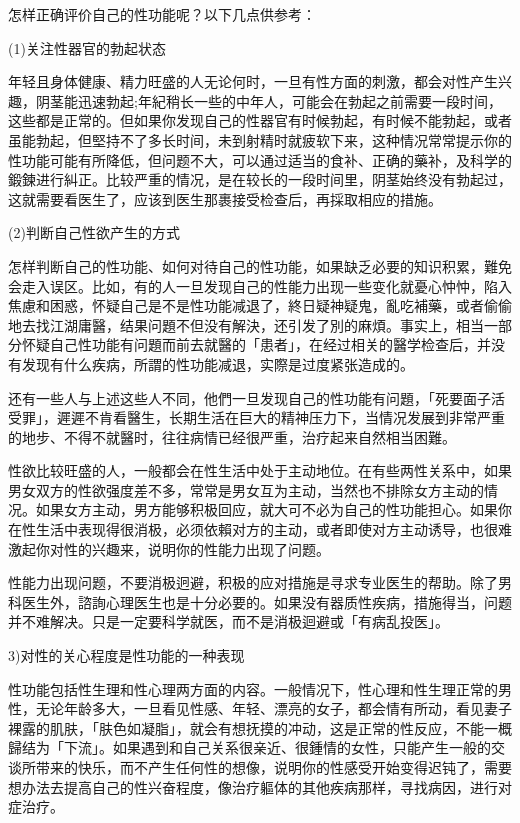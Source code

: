 \documentclass[12pt,UTF8]{ctexbook}
\begin{document}
怎样正确评价自己的性功能呢？以下几点供参考：

(1)关注性器官的勃起状态

年轻且身体健康、精力旺盛的人无论何时，一旦有性方面的刺激，都会对性产生兴趣，阴茎能迅速勃起;年紀稍长一些的中年人，可能会在勃起之前需要一段时间，这些都是正常的。但如果你发现自己的性器官有时候勃起，有时候不能勃起，或者虽能勃起，但堅持不了多长时间，未到射精时就疲软下来，这种情况常常提示你的性功能可能有所降低，但问题不大，可以通过适当的食补、正确的藥补，及科学的鍛鍊进行糾正。比较严重的情况，是在较长的一段时间里，阴茎始终没有勃起过，这就需要看医生了，应该到医生那裹接受检查后，再採取相应的措施。

(2)判断自己性欲产生的方式

怎样判断自己的性功能、如何对待自己的性功能，如果缺乏必要的知识积累，難免会走入误区。比如，有的人一旦发现自己的性能力出现一些变化就憂心忡忡，陷入焦慮和困惑，怀疑自己是不是性功能减退了，終日疑神疑鬼，亂吃補藥，或者偷偷地去找江湖庸醫，结果问題不但没有解決，还引发了別的麻煩。事实上，相当一部分怀疑自己性功能有问題而前去就醫的「患者」，在经过相关的醫学检查后，并没有发现有什么疾病，所謂的性功能减退，实際是过度紧张造成的。

还有一些人与上述这些人不同，他們一旦发现自己的性功能有问題，「死要面子活受罪」，遲遲不肯看醫生，长期生活在巨大的精神压力下，当情况发展到非常严重的地步、不得不就醫时，往往病情已经很严重，治疗起来自然相当困難。

性欲比较旺盛的人，一般都会在性生活中处于主动地位。在有些两性关系中，如果男女双方的性欲强度差不多，常常是男女互为主动，当然也不排除女方主动的情况。如果女方主动，男方能够积极回应，就大可不必为自己的性功能担心。如果你在性生活中表现得很消极，必须依賴对方的主动，或者即使对方主动诱导，也很难激起你对性的兴趣来，说明你的性能力出现了问题。

性能力出现问题，不要消极迥避，积极的应对措施是寻求专业医生的帮助。除了男科医生外，諮詢心理医生也是十分必要的。如果没有器质性疾病，措施得当，问题并不难解决。只是一定要科学就医，而不是消极迴避或「有病乱投医」。

3)对性的关心程度是性功能的一种表现

性功能包括性生理和性心理两方面的内容。一般情况下，性心理和性生理正常的男性，无论年龄多大，一旦看见性感、年轻、漂亮的女子，都会情有所动，看见妻子裸露的肌肤，「肤色如凝脂」，就会有想抚摸的冲动，这是正常的性反应，不能一概歸结为「下流」。如果遇到和自己关系很亲近、很鍾情的女性，只能产生一般的交谈所带来的快乐，而不产生任何性的想像，说明你的性感受开始变得迟钝了，需要想办法去提高自己的性兴奋程度，像治疗軀体的其他疾病那样，寻找病因，进行对症治疗。
\end{document}
